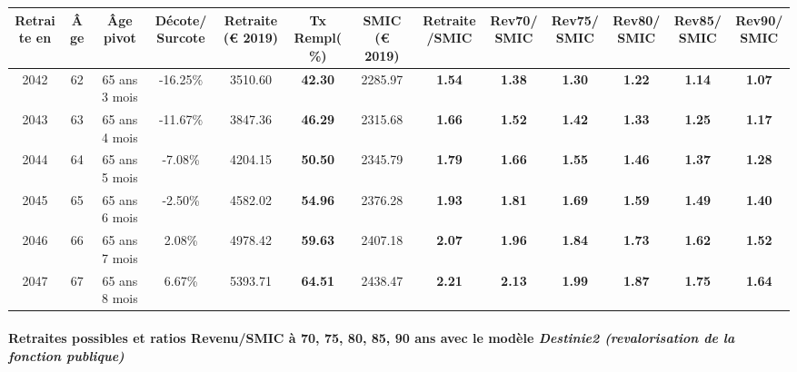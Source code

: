 { \scriptsize \begin{center} 
\begin{tabular}[htb]{|c|c||c|c||c|c||c||c|c|c|c|c|c|} 
\hline 
 Retraite en &  Âge &  Âge pivot &  Décote/Surcote &  Retraite (\euro{} 2019) &  Tx Rempl(\%) &  SMIC (\euro{} 2019) &  Retraite/SMIC &  Rev70/SMIC &  Rev75/SMIC &  Rev80/SMIC &  Rev85/SMIC &  Rev90/SMIC \\ 
\hline \hline 
 2042 &  62 &  65 ans 3 mois &  -16.25\% &  3510.60 &  {\bf 42.30} &  2285.97 &  {\bf 1.54} &  {\bf 1.38} &  {\bf 1.30} &  {\bf 1.22} &  {\bf 1.14} &  {\bf 1.07} \\ 
\hline 
 2043 &  63 &  65 ans 4 mois &  -11.67\% &  3847.36 &  {\bf 46.29} &  2315.68 &  {\bf 1.66} &  {\bf 1.52} &  {\bf 1.42} &  {\bf 1.33} &  {\bf 1.25} &  {\bf 1.17} \\ 
\hline 
 2044 &  64 &  65 ans 5 mois &  -7.08\% &  4204.15 &  {\bf 50.50} &  2345.79 &  {\bf 1.79} &  {\bf 1.66} &  {\bf 1.55} &  {\bf 1.46} &  {\bf 1.37} &  {\bf 1.28} \\ 
\hline 
 2045 &  65 &  65 ans 6 mois &  -2.50\% &  4582.02 &  {\bf 54.96} &  2376.28 &  {\bf 1.93} &  {\bf 1.81} &  {\bf 1.69} &  {\bf 1.59} &  {\bf 1.49} &  {\bf 1.40} \\ 
\hline 
 2046 &  66 &  65 ans 7 mois &  2.08\% &  4978.42 &  {\bf 59.63} &  2407.18 &  {\bf 2.07} &  {\bf 1.96} &  {\bf 1.84} &  {\bf 1.73} &  {\bf 1.62} &  {\bf 1.52} \\ 
\hline 
 2047 &  67 &  65 ans 8 mois &  6.67\% &  5393.71 &  {\bf 64.51} &  2438.47 &  {\bf 2.21} &  {\bf 2.13} &  {\bf 1.99} &  {\bf 1.87} &  {\bf 1.75} &  {\bf 1.64} \\ 
\hline 
\hline 
\end{tabular} 
\end{center} } 
\paragraph{Retraites possibles et ratios Revenu/SMIC à 70, 75, 80, 85, 90 ans avec le modèle \emph{Destinie2 (revalorisation de la fonction publique)}}  
 
